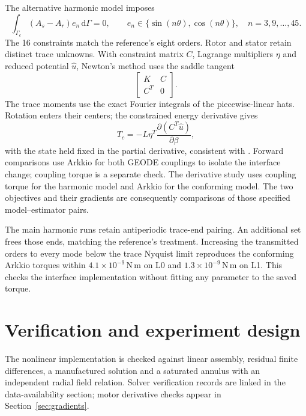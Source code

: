 \documentclass{anvil-paper}
\newcommand{\dd}{\,\mathrm{d}}
\begin{document}
The alternative harmonic model imposes
\begin{equation}
 \int_{\Gamma_c}(A_s-A_r)e_n\dd\Gamma=0,\qquad
 e_n\in\{\sin(n\theta),\cos(n\theta)\},\quad n=3,9,\ldots,45.
\end{equation}
The 16 constraints match the reference's eight orders. Rotor and stator
retain distinct trace unknowns. With constraint matrix $C$, Lagrange
multipliers $\eta$ and reduced potential $\hat u$, Newton's method uses
the saddle tangent
\begin{equation}
 \begin{bmatrix}K&C\\ C^T&0\end{bmatrix}.
\end{equation}
The trace moments use the exact Fourier integrals of the piecewise-linear
hats. Rotation enters their centers; the constrained energy derivative gives
\begin{equation}
 T_c=-L\eta^T\frac{\partial(C^T\hat u)}{\partial\beta},
 \label{eq:couplingtorque}
\end{equation}
with the state held fixed in the partial derivative, consistent with
\citet{egger2022torque}. Forward comparisons use Arkkio for both GEODE
couplings to isolate the interface change; coupling torque is a separate
check. The derivative study uses coupling torque for the harmonic model
and Arkkio for the conforming model. The two objectives and their gradients
are consequently comparisons of those specified model--estimator pairs.

The main harmonic runs retain antiperiodic trace-end pairing. An additional
set frees those ends, matching the reference's treatment. Increasing the
transmitted orders to every mode below the trace Nyquist limit reproduces
the conforming Arkkio torques within $4.1\times10^{-9}$\,N\,m on L0 and
$1.3\times10^{-9}$\,N\,m on L1. This checks the interface implementation
without fitting any parameter to the saved torque.

\section{Verification and experiment design}
The nonlinear implementation is checked against linear assembly, residual
finite differences, a manufactured solution and a saturated annulus with
an independent radial field relation. Solver verification records are
linked in the data-availability section; motor derivative checks appear
in Section~\ref{sec:gradients}.
\end{document}
